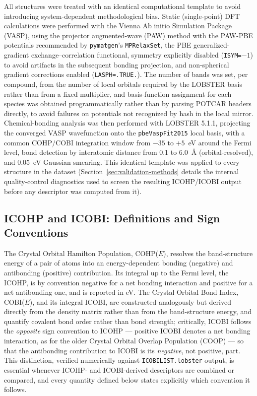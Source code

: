 \documentclass[journal=jpccck,manuscript=article]{achemso}
\begin{document}
All structures were treated with an identical computational template to
avoid introducing system-dependent methodological bias. Static
(single-point) DFT calculations were performed with the Vienna Ab initio
Simulation Package (VASP),\cite{kresse1996} using the projector
augmented-wave (PAW) method\cite{blochl1994,kresse1999} with the PAW-PBE
potentials recommended by \texttt{pymatgen}'s \texttt{MPRelaxSet}, the PBE
generalized-gradient exchange--correlation functional,\cite{perdew1996}
symmetry explicitly disabled (\texttt{ISYM=$-1$}) to avoid artifacts in the
subsequent bonding projection, and non-spherical gradient corrections
enabled (\texttt{LASPH=.TRUE.}). The number of bands was set, per compound,
from the number of local orbitals required by the LOBSTER basis rather than
from a fixed multiplier, and basis-function assignment for each species was
obtained programmatically rather than by parsing POTCAR headers directly, to
avoid failures on potentials not recognized by hash in the local mirror.
Chemical-bonding analysis was then performed with LOBSTER
5.1.1,\cite{maintz2016,nelson2020} projecting the converged VASP wavefunction
onto the \texttt{pbeVaspFit2015} local basis, with a common COHP/COBI
integration window from $-35$ to $+5$~eV around the Fermi level, bond
detection by interatomic distance from 0.1 to 6.0~\AA{} (orbital-resolved),
and 0.05~eV Gaussian smearing. This identical template was applied to every
structure in the dataset (Section~\ref{sec:validation-methods} details the
internal quality-control diagnostics used to screen the resulting
ICOHP/ICOBI output before any descriptor was computed from it).

\subsection{ICOHP and ICOBI: Definitions and Sign Conventions}
\label{sec:icohp-icobi-def}

The Crystal Orbital Hamilton Population, COHP($E$), resolves the
band-structure energy of a pair of atoms into an energy-dependent bonding
(negative) and antibonding (positive) contribution.\cite{dronskowski1993} Its
integral up to the Fermi level, the ICOHP, is by convention negative for a
net bonding interaction and positive for a net antibonding one, and is
reported in eV. The Crystal Orbital Bond Index, COBI($E$), and its integral
ICOBI, are constructed analogously but derived directly from the density
matrix rather than from the band-structure energy, and quantify covalent
bond order rather than bond strength;\cite{muller2021} critically, ICOBI
follows the \emph{opposite} sign convention to ICOHP --- positive ICOBI
denotes a net bonding interaction, as for the older Crystal Orbital Overlap
Population (COOP) --- so that the antibonding contribution to ICOBI is its
\emph{negative}, not positive, part. This distinction, verified numerically
against \texttt{ICOBILIST.lobster} output, is essential whenever ICOHP- and
ICOBI-derived descriptors are combined or compared, and every quantity
defined below states explicitly which convention it follows.
\end{document}
